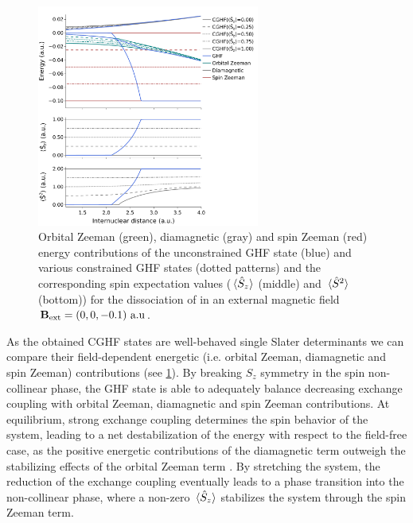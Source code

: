 \documentclass[journal=jctc,manuscript=article]{achemso}
\begin{document}
        \begin{figure}
            \centering
            \includegraphics[width=0.65\textwidth]{C-GHF-energy-contributions(H2)(med-B)-S2}
            \caption{
                Orbital Zeeman (green), diamagnetic (gray) and spin Zeeman (red) energy contributions of the unconstrained GHF state (blue) and various constrained GHF states (dotted patterns) and the corresponding spin expectation values ($\ev*{\hat{S}_z}$ (middle) and $\ev*{\hat{S}^2}$ (bottom)) for the dissociation of  in an external magnetic field $\vb{B}_{\text{ext}} = (0,0,-0.1)\text{ a.u}$.
            }
            \label{fig:C-GHF-energy-contributions(H2)(med-B)}
        \end{figure}

        As the obtained CGHF states are well-behaved single Slater determinants we can compare their field-dependent energetic (i.e. orbital Zeeman, diamagnetic and spin Zeeman) contributions \cite{Sun.2019} (see \cref{fig:C-GHF-energy-contributions(H2)(med-B)}). 
        By breaking $S_z$ symmetry in the spin non-collinear phase, the GHF state is able to adequately balance decreasing exchange coupling with orbital Zeeman, diamagnetic and spin Zeeman contributions.
        At equilibrium, strong exchange coupling determines the spin behavior of the system, leading to a net destabilization of the energy with respect to the field-free case, as the positive energetic contributions of the diamagnetic term outweigh the stabilizing effects of the orbital Zeeman term \cite{Sun.2019}. By stretching the system, the reduction of the exchange coupling eventually leads to a phase transition into the non-collinear phase, where a non-zero $\ev*{\hat{S}_z}$ stabilizes the system through the spin Zeeman term. 
        
\end{document}

